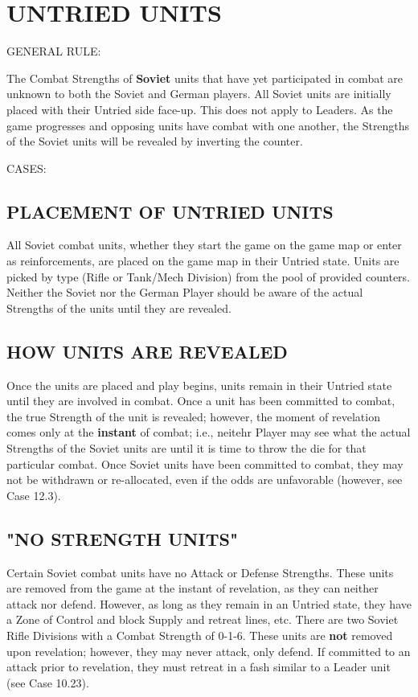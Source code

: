 \section{UNTRIED UNITS}

GENERAL RULE:

The Combat Strengths of \textbf{Soviet} units that have yet participated in combat are unknown to both the Soviet and German players. All Soviet units are initially placed with their Untried side face-up. This does not apply to Leaders. As the game progresses and opposing units have combat with one another, the Strengths of the Soviet units will be revealed by inverting the counter.

CASES:

\subsection{PLACEMENT OF UNTRIED UNITS}

All Soviet combat units, whether they start the game on the game map or enter as reinforcements, are placed on the game map in their Untried state. Units are picked by type (Rifle or Tank/Mech Division) from the pool of provided counters. Neither the Soviet nor the German Player should be aware of the actual Strengths of the units until they are revealed.

\subsection{HOW UNITS ARE REVEALED}

Once the units are placed and play begins, units remain in their Untried state until they are involved in combat. Once a unit has been committed to combat, the true Strength of the unit is revealed; however, the moment of revelation comes only at the \textbf{instant} of combat; i.e., neitehr Player may see what the actual Strengths of the Soviet units are until it is time to throw the die for that particular combat. Once Soviet units have been committed to combat, they may not be withdrawn or re-allocated, even if the odds are unfavorable (however, see Case 12.3).

\subsection{"NO STRENGTH UNITS"}

Certain Soviet combat units have no Attack or Defense Strengths. These units are removed from the game at the instant of revelation, as they can neither attack nor defend. However, as long as they remain in an Untried state, they have a Zone of Control and block Supply and retreat lines, etc. There are two Soviet Rifle Divisions with a Combat Strength of 0-1-6. These units are \textbf{not} removed upon revelation; however, they may never attack, only defend. If committed to an attack prior to revelation, they must retreat in a fash similar to a Leader unit (see Case 10.23).

